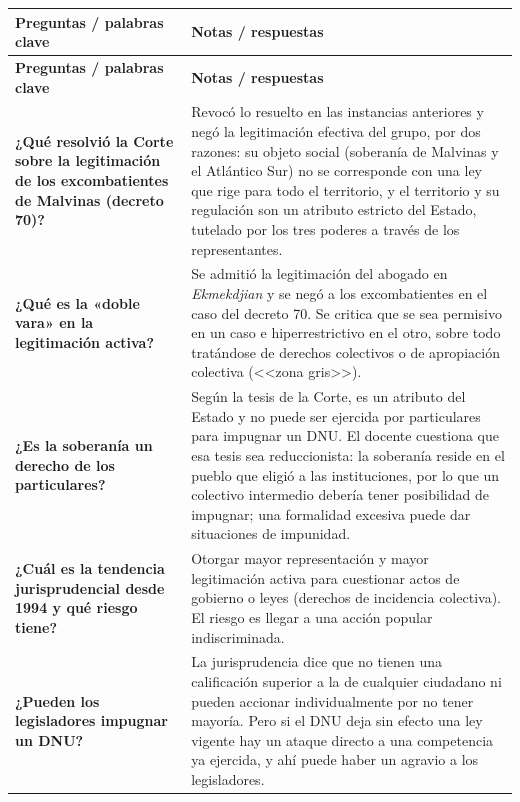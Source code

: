 \documentclass[12pt,oneside]{book}
\newlength{\cornellL}
\newlength{\cornellR}
\begin{document}
\begin{longtable}{|>{\raggedright\arraybackslash}p{\cornellL}|>{\raggedright\arraybackslash}p{\cornellR}|}
\hline
\textbf{Preguntas / palabras clave} & \textbf{Notas / respuestas} \\
\hline
\endfirsthead
\hline
\textbf{Preguntas / palabras clave} & \textbf{Notas / respuestas} \\
\hline
\endhead

\textbf{¿Qué resolvió la Corte sobre la legitimación de los excombatientes de Malvinas (decreto 70)?} &
Revocó lo resuelto en las instancias anteriores y negó la legitimación efectiva del grupo, por dos razones: su objeto social (soberanía de Malvinas y el Atlántico Sur) no se corresponde con una ley que rige para todo el territorio, y el territorio y su regulación son un atributo estricto del Estado, tutelado por los tres poderes a través de los representantes. \\
\hline

\textbf{¿Qué es la «doble vara» en la legitimación activa?} &
Se admitió la legitimación del abogado en \textit{Ekmekdjian} y se negó a los excombatientes en el caso del decreto 70. Se critica que se sea permisivo en un caso e hiperrestrictivo en el otro, sobre todo tratándose de derechos colectivos o de apropiación colectiva (<<zona gris>>). \\
\hline

\textbf{¿Es la soberanía un derecho de los particulares?} &
Según la tesis de la Corte, es un atributo del Estado y no puede ser ejercida por particulares para impugnar un DNU. El docente cuestiona que esa tesis sea reduccionista: la soberanía reside en el pueblo que eligió a las instituciones, por lo que un colectivo intermedio debería tener posibilidad de impugnar; una formalidad excesiva puede dar situaciones de impunidad. \\
\hline

\textbf{¿Cuál es la tendencia jurisprudencial desde 1994 y qué riesgo tiene?} &
Otorgar mayor representación y mayor legitimación activa para cuestionar actos de gobierno o leyes (derechos de incidencia colectiva). El riesgo es llegar a una acción popular indiscriminada. \\
\hline

\textbf{¿Pueden los legisladores impugnar un DNU?} &
La jurisprudencia dice que no tienen una calificación superior a la de cualquier ciudadano ni pueden accionar individualmente por no tener mayoría. Pero si el DNU deja sin efecto una ley vigente hay un ataque directo a una competencia ya ejercida, y ahí puede haber un agravio a los legisladores. \\
\hline


\end{longtable}
\end{document}
